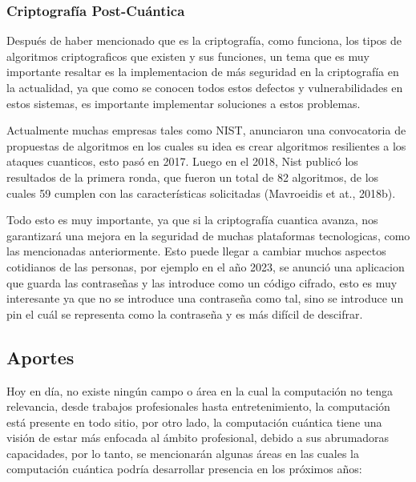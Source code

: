 \documentclass{article}
\begin{document}
\subsubsection{Criptografía Post-Cuántica}
Después de haber mencionado que es la criptografía, como funciona, los tipos de algoritmos criptograficos que existen y sus funciones, un tema que es muy importante resaltar es la implementacion de más seguridad en la criptografía en la actualidad, ya que como se conocen todos estos defectos y vulnerabilidades en estos sistemas, es importante implementar soluciones a estos problemas.

Actualmente muchas empresas tales como NIST, anunciaron una convocatoria de propuestas de algoritmos en los cuales su idea es crear algoritmos resilientes a los ataques cuanticos, esto pasó en 2017. Luego en el 2018, Nist publicó los resultados de la primera ronda, que fueron un total de 82 algoritmos, de los cuales 59 cumplen con las características solicitadas (Mavroeidis et at., 2018b).

Todo esto es muy importante, ya que si la criptografía cuantica avanza, nos garantizará una mejora en la seguridad de muchas plataformas tecnologicas, como las mencionadas anteriormente. Esto puede llegar a cambiar muchos aspectos cotidianos de las personas, por ejemplo en el año 2023, se anunció una aplicacion que guarda las contraseñas y las introduce como un código cifrado, esto es muy interesante ya que no se introduce una contraseña como tal, sino se introduce un pin el cuál se representa como la contraseña y es más difícil de descifrar.


\subsection{Aportes}
Hoy en día, no existe ningún campo o área en la cual la computación no tenga relevancia, desde trabajos profesionales hasta entretenimiento, la computación está presente en todo sitio, por otro lado, la computación cuántica tiene una visión de estar más enfocada al ámbito profesional, debido a sus abrumadoras capacidades, por lo tanto, se mencionarán algunas áreas en las cuales la computación cuántica podría desarrollar presencia en los próximos años:
\end{document}
